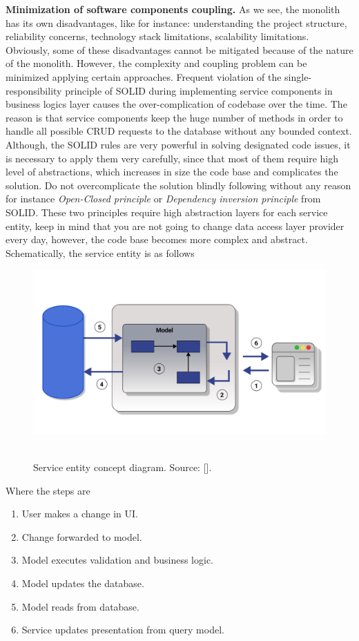 \textbf{Minimization of software components coupling.} As we see, the monolith has its own disadvantages, like for instance:
understanding the project structure, reliability concerns, technology stack limitations, scalability limitations.
Obviously, some of these disadvantages cannot be mitigated because of the nature of the monolith.
However, the complexity and coupling problem can be minimized applying certain approaches.
Frequent violation of the single-responsibility principle of SOLID during implementing service components
in business logics layer causes the over-complication of codebase over the time.
The reason is that service components keep the huge number of methods in order to handle all possible CRUD requests
to the database without any bounded context.
Although, the SOLID rules are very powerful in solving designated code issues, it is necessary to apply them very carefully,
since that most of them require high level of abstractions, which increases in size the code base and complicates the
solution.
Do not overcomplicate the solution blindly following without any reason for instance \textit{Open-Closed principle}
or \textit{Dependency inversion principle} from SOLID\@.
These two principles require high abstraction layers for each service entity, keep in mind that you are not going to change
data access layer provider every day, however, the code base becomes more complex and abstract.
Schematically, the service entity is as follows
\begin{figure}[H]
    \centering
    \includegraphics[width=1\textwidth]{Pictures/04_Service_entity_concept_diagram}
    ~\caption{Service entity concept diagram. Source: [\cite{fowler2011cqrs}].}\label{fig:figure9}
\end{figure}
Where the steps are
\begin{enumerate}
    \item User makes a change in UI\@.
    \item Change forwarded to model.
    \item Model executes validation and business logic.
    \item Model updates the database.
    \item Model reads from database.
    \item Service updates presentation from query model.
\end{enumerate}

